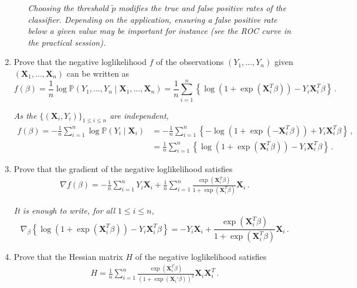 \documentclass[a4paper,10pt,fleqn]{article}
\newcommand{\eqsp}{\,}
\newcommand{\1}{\ensuremath{\mathbbm{1}}}
\newcommand{\bX}{\mathbf{X}}
\begin{document}
\begin{enumerate}
\begin{enumerate}
\vspace{.2cm}

{\em
Choosing the threshold $\tilde p$ modifies the true and false positive rates of the classifier. Depending on the application, ensuring a false positive rate below a given value  may be important for instance (see the ROC curve in the practical session).
}
\end{enumerate}
	\item %
	Prove that the negative loglikelihood $f$ of the observations $(Y_1,\ldots,Y_n)$ given $(\bX_1,\ldots,\bX_n)$ can be written as 
	$$
	f(\beta) =   \frac{1}{n}\log \mathbb{P}\left(Y_1,\ldots,Y_n\middle | \bX_1,\ldots,\bX_n\right) = \frac{1}{n}\sum_{i=1}^n \left\{\log(1+\exp(\bX_{i}^T\beta))- Y_{i}\bX_{i}^T\beta\right\}\eqsp.
	$$
	
\vspace{.2cm}

{\em
As the $\{(\bX_i,Y_i)\}_{1\leqslant i\leqslant n}$ are independent, 
\begin{align*}
f(\beta) =   -\frac{1}{n}\sum_{i=1}^n \log \mathbb{P}\left(Y_i\middle | \bX_i\right) &= - \frac{1}{n}\sum_{i=1}^n \left\{-\log(1+\exp(-\bX_{i}^T\beta)) + Y_{i}\bX_{i}^T\beta\right\}\eqsp,\\
&= \frac{1}{n}\sum_{i=1}^n \left\{\log(1+\exp(\bX_{i}^T\beta))- Y_{i}\bX_{i}^T\beta\right\}\eqsp.
\end{align*}
}
	\item Prove that the gradient of the negative loglikelihood satisfies
	\begin{align*}
	\nabla f (\beta) = - \frac{1}{n}\sum_{i=1}^n Y_i \bX_i + \frac{1}{n}\sum_{i=1}^n \frac{\exp(\bX_{i}^T\beta)}{1  + \exp(\bX_{i}^T\beta)} \bX_i\eqsp.
	\end{align*}

\vspace{.2cm}

{\em
It is enough to write, for all $1\leqslant i\leqslant n$,
$$
\nabla_{\beta}\left\{\log(1+\exp(\bX_{i}^T\beta))- Y_{i}\bX_{i}^T\beta\right\} =  -Y_i \bX_i +  \frac{\exp(\bX_{i}^T\beta)}{1  + \exp(\bX_{i}^T\beta)} \bX_i\eqsp.
$$
}
	\item Prove that the Hessian matrix $H$ of the negative loglikelihood satisfies
	\begin{align*}
	H = \frac{1}{n}\sum_{i=1}^n \frac{\exp(\bX_{i}^T\beta)}{(1  + \exp(\bX_{i}'\beta))^2} \bX_i\bX_i^T\eqsp.
	\end{align*}


\end{enumerate}
\end{document}
